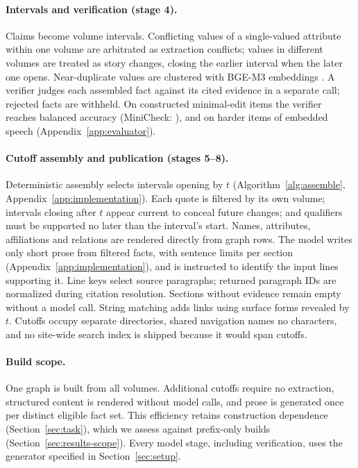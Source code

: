 \paragraph{Intervals and verification (stage 4).}
Claims become volume intervals. Conflicting values of a single-valued attribute within one
volume are arbitrated as extraction conflicts; values in different volumes are treated as
story changes, closing the earlier interval when the later one opens. Near-duplicate values
are clustered with BGE-M3 embeddings \citep{chen2024m3}. A verifier judges each assembled
fact against its cited evidence in a separate call; rejected facts are withheld.
On  constructed minimal-edit items the verifier reaches 
balanced accuracy (MiniCheck: ), and  on
 harder items of embedded speech (Appendix~\ref{app:evaluator}).

\paragraph{Cutoff assembly and publication (stages 5--8).}
Deterministic assembly selects intervals opening by $t$
(Algorithm~\ref{alg:assemble}, Appendix~\ref{app:implementation}). Each quote is filtered
by its own volume; intervals closing after $t$ appear current to conceal future changes;
and qualifiers must be supported no later than the interval's start. Names, attributes,
affiliations and relations are rendered directly from graph rows. The model writes only
short prose from filtered facts, with sentence limits per section
(Appendix~\ref{app:implementation}), and is instructed to identify the input lines supporting it.
Line keys select source paragraphs; returned paragraph IDs are normalized during citation
resolution. Sections without evidence remain empty without a model call.
String matching adds links using surface forms revealed by $t$. Cutoffs occupy separate
directories, shared navigation names no characters, and no site-wide search index is shipped
because it would span cutoffs.

\paragraph{Build scope.}
One graph is built from all volumes. Additional cutoffs require no extraction, structured
content is rendered without model calls, and prose is generated once per distinct eligible
fact set. This efficiency retains construction dependence (Section~\ref{sec:task}), which
we assess against prefix-only builds (Section~\ref{sec:results-scope}). Every model stage,
including verification, uses the generator specified in Section~\ref{sec:setup}.
